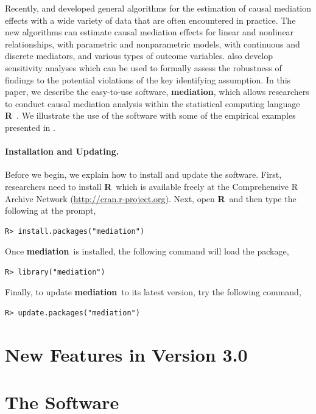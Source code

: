 \documentclass[11pt,letterpaper]{article}
\theoremstyle{plain}
\newcommand\bR{{\bf R}}
\newcommand\bmediation{{\bf mediation}}
\begin{document}
Recently, \citet*{imai:keel:yama:10} and \citet*{imai:keel:ting:10}
developed general algorithms for the estimation of causal mediation
effects with a wide variety of data that are often encountered in
practice.  The new algorithms can estimate causal mediation effects
for linear and nonlinear relationships, with parametric and
nonparametric models, with continuous and discrete mediators, and
various types of outcome variables.
\citet{imai:keel:yama:10,imai:keel:ting:10} also develop sensitivity
analyses which can be used to formally assess the robustness of
findings to the potential violations of the key identifying
assumption.  In this paper, we describe the easy-to-use software,
\bmediation, which allows researchers to conduct causal mediation
analysis within the statistical computing language \bR\ \citep{R:09}.
We illustrate the use of the software with some of the empirical
examples presented in \citet{imai:keel:ting:10}.

\paragraph{Installation and Updating.} Before we begin, we explain how
to install and update the software.  First, researchers need to
install \bR\ which is available freely at the Comprehensive R Archive
Network (\href{http://cran.r-project.org}{http://cran.r-project.org}).
Next, open \bR\ and then type the following at the prompt,
\begin{verbatim}
R> install.packages("mediation")
\end{verbatim}
Once \bmediation\ is installed, the following command will load the package,
\begin{verbatim}
R> library("mediation")
\end{verbatim}
Finally, to update \bmediation\ to its latest version, try the
following command,
\begin{verbatim}
R> update.packages("mediation")
\end{verbatim}

\section{New Features in Version 3.0}



\section{The Software}
\end{document}
